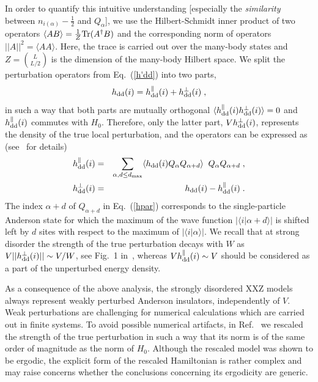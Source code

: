 \documentclass[twocolumn,pre,superscriptaddress,10pt,aps,floatfix]{revtex4-1}
\begin{document}
In order to quantify this intuitive understanding [especially the {\em similarity} between $n_{i(\alpha)}-\frac{1}{2}$ and $Q_{\alpha}$], we use the Hilbert-Schmidt inner product of two operators $\langle A  B \rangle=\frac{1}{Z} {\rm Tr}(A^\dagger  B)$ and the corresponding norm of operators $||A||^2=\langle A A \rangle$.  Here, the trace is carried out over the many-body states and $Z = {\binom{L}{L/2}}$ is the dimension of the many-body Hilbert space. 
We split the perturbation operators from Eq.~(\ref{h'dd}) into two parts, 
\begin{equation} \label{def_hdd_parts}
h_{\rm dd}(i)=h^{\parallel}_{\rm dd}(i)+h^{\perp}_{\rm dd}(i)\;,
\end{equation}
in such a way that both parts are mutually orthogonal 
$\langle h^{\parallel}_{\rm dd}(i) h^{\perp}_{\rm dd}(i) \rangle=0$ and $h^{\parallel}_{\rm dd}(i)$ commutes with $H_0$. Therefore, only the latter part,  $V h^{\perp}_{\rm dd}(i)$, represents the density of the true local perturbation, and the operators can be expressed as (see~\cite{krajewski_vidmar_22} for details)
\begin{eqnarray}
h^{\parallel}_{\rm dd}(i)&=&\sum_{\alpha,d \le d_{\rm max}} \langle  h_{\rm dd}(i)  Q_{\alpha}Q_{\alpha+d}  \rangle  \;\; Q_{\alpha}Q_{\alpha+d}\;, \label{hpar} \\
h^{\perp}_{\rm dd}(i)&=& h_{\rm dd}(i)  - h^{\parallel}_{\rm dd}(i)\;. \label{hperp} 
\end{eqnarray} 
The index $\alpha+d$ of $Q_{\alpha+d}$ in Eq.~(\ref{hpar}) corresponds to the single-particle Anderson state for which the maximum of the wave function $|\langle i | \alpha+d \rangle|$ is shifted left by $d$ sites with respect to the maximum of $|\langle i | \alpha \rangle|$.
We recall that at strong disorder the strength of the true perturbation decays with $W$ as $V|| h^{\perp}_{\rm dd}(i) || \sim  V/W$, see Fig.~1 in~\cite{krajewski_vidmar_22}, whereas $V   h^{\parallel}_{\rm dd}(i)  \sim  V$ should be considered as a part
of the unperturbed energy density.  

As a consequence of the above analysis, the strongly disordered XXZ models always represent weakly perturbed Anderson insulators, independently of $V$. 
Weak perturbations are challenging for numerical calculations which are carried out in finite systems. To avoid possible numerical artifacts, in Ref.~\cite{krajewski_vidmar_22} we rescaled the strength of the true perturbation in such a way that its norm is of the same order of magnitude as the norm of $H_0$. Although the rescaled model was shown to be ergodic, the explicit form of the rescaled Hamiltonian is rather complex and may raise concerns whether the conclusions concerning its ergodicity are generic.
 
\end{document}
